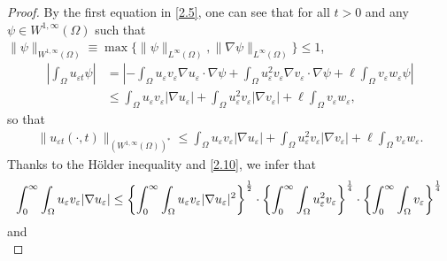 \documentclass[12pt]{article}
\theoremstyle{plain}
\theoremstyle{definition}
\numberwithin{equation}{section}
\begin{document}
\begin{proof}
    By the first equation in \eqref{2.5}, one can see that for all $t>0$ and any $\psi\in W^{1,\infty}(\Omega) $ such that $\|\psi\|_{W^{1,\infty}(\Omega)}\equiv \max\{\|\psi\|_{L^{\infty}(\Omega)},\|\nabla \psi\|_{L^{\infty}(\Omega)}\}\leq 1$,
    \begin{align*}
   \left |\int_{\Omega}u_{\varepsilon t}\psi\right|&=\left|-\int_{\Omega}u_{\varepsilon}v_{\varepsilon}\nabla u_{\varepsilon}\cdot\nabla\psi + \int_{\Omega}u_{\varepsilon}^{2}v_{\varepsilon}\nabla v_{\varepsilon}\cdot\nabla\psi+\ell\int_{\Omega}v_{\varepsilon}w_{\varepsilon}\psi\right|\\
    &\leq \int_{\Omega}u_{\varepsilon}v_{\varepsilon}|\nabla u_{\varepsilon}| + \int_{\Omega}u_{\varepsilon}^{2}v_{\varepsilon}|\nabla v_{\varepsilon}|+\ell\int_{\Omega}v_{\varepsilon}w_{\varepsilon},
    \end{align*}
 so that
 \begin{align}\label{4.2}
     \|u_{\varepsilon t}(\cdot,t)\|_{(W^{1,\infty}(\Omega))^*}\leq \int_{\Omega}u_{\varepsilon}v_{\varepsilon}|\nabla u_{\varepsilon}| +\int_{\Omega}u_{\varepsilon}^{2}v_{\varepsilon}|\nabla v_{\varepsilon}|+\ell\int_{\Omega}v_{\varepsilon}w_{\varepsilon}.
 \end{align}
 Thanks to the H\"{o}lder inequality and \eqref{2.10},  we infer that
  \begin{equation}\label{4.3}
     \int_0^{\infty}\int_{\Omega}u_{\varepsilon}v_{\varepsilon}|\nabla u_{\varepsilon}|
     \leq\left\{\int_0^{\infty}\int_{\Omega}u_{\varepsilon}v_{\varepsilon}|\nabla u_{\varepsilon}|^2\right\}^{\frac{1}{2}}\cdot \left\{\int_0^{\infty}\int_{\Omega}u_{\varepsilon}^{2}v_{\varepsilon} \right\}^{\frac{1}{4}}\cdot \left\{\int_0^{\infty}\int_{\Omega}v_{\varepsilon} \right\}^{\frac{1}{4}}\\
 \end{equation}
 and
  \begin{equation}\label{4.4}

\end{equation}
\end{proof}
\end{document}
